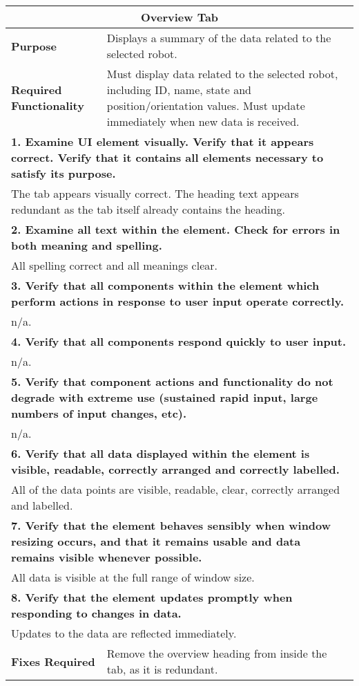 \begin{longtable}{ l p{10cm} }
 \hline
 \multicolumn{2}{c}{\textbf{Overview Tab}}\\
 \hline
 \textbf{Purpose} & Displays a summary of the data related to the selected robot.\\
 \textbf{Required Functionality} & Must display data related to the selected robot, including ID, name, state and position/orientation values. Must update immediately when new data is received.\\
 \hline
 \multicolumn{2}{p{14cm}}{\textbf{1. Examine UI element visually. Verify that it appears correct. Verify that it contains all elements necessary to satisfy its purpose.}}\\
 \multicolumn{2}{p{14cm}}{The tab appears visually correct. The heading text appears redundant as the tab itself already contains the heading.}\\
 \hline
 \multicolumn{2}{p{14cm}}{\textbf{2. Examine all text within the element. Check for errors in both meaning and spelling.}}\\
 \multicolumn{2}{p{14cm}}{All spelling correct and all meanings clear.}\\
 \hline
 \multicolumn{2}{p{14cm}}{\textbf{3. Verify that all components within the element which perform actions in response to user input operate correctly.}}\\
 \multicolumn{2}{p{14cm}}{n/a.}\\
 \hline
 \multicolumn{2}{p{14cm}}{\textbf{4. Verify that all components respond quickly to user input.}}\\
 \multicolumn{2}{p{14cm}}{n/a.}\\
 \hline
 \multicolumn{2}{p{14cm}}{\textbf{5. Verify that component actions and functionality do not degrade with extreme use (sustained rapid input, large numbers of input changes, etc).}}\\
 \multicolumn{2}{p{14cm}}{n/a.}\\
 \hline
 \multicolumn{2}{p{14cm}}{\textbf{6. Verify that all data displayed within the element is visible, readable, correctly arranged and correctly labelled.}}\\
 \multicolumn{2}{p{14cm}}{All of the data points are visible, readable, clear, correctly arranged and labelled.}\\
 \hline
 \multicolumn{2}{p{14cm}}{\textbf{7. Verify that the element behaves sensibly when window resizing occurs, and that it remains usable and data remains visible whenever possible.}}\\
 \multicolumn{2}{p{14cm}}{All data is visible at the full range of window size.}\\
 \hline
 \multicolumn{2}{p{14cm}}{\textbf{8. Verify that the element updates promptly when responding to changes in data.}}\\
 \multicolumn{2}{p{14cm}}{Updates to the data are reflected immediately.}\\
 \hline
 \textbf{Fixes Required} & Remove the overview heading from inside the tab, as it is redundant.\\
 \bottomrule
\end{longtable}
\clearpage

